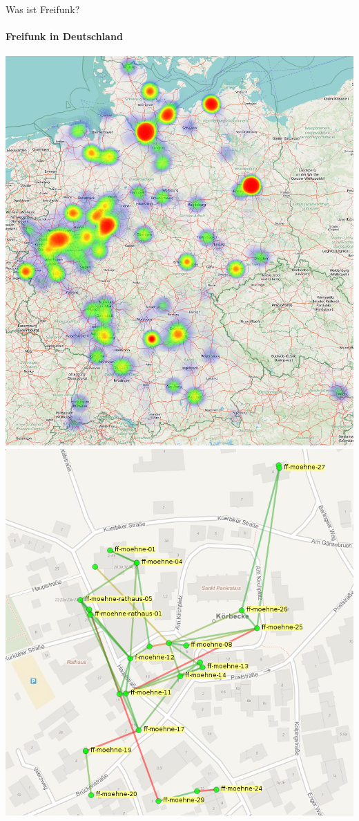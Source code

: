 \documentclass{beamer}
\begin{document}
\begin{frame}{Was ist Freifunk?}
\framesubtitle{Freifunk in Deutschland}
\includegraphics[height=0.6\textheight]{images/heatmap_germany} \hfill
\includegraphics[height=0.6\textheight]{images/ffmap_moehne}
\end{frame}
\end{document}
